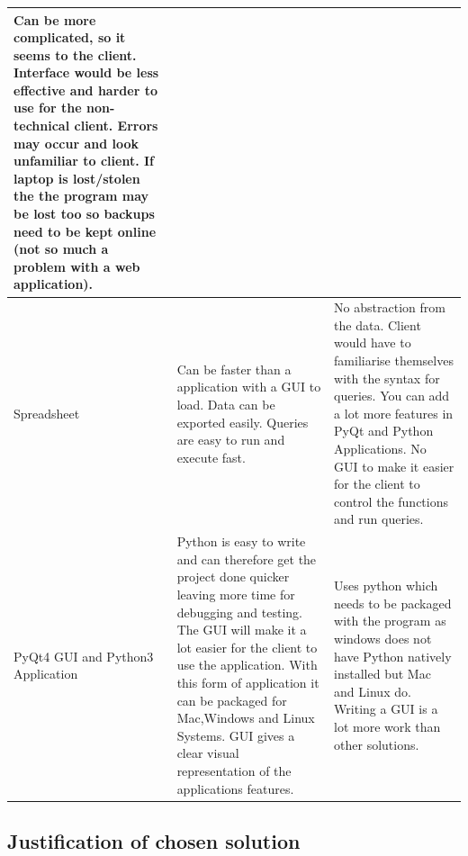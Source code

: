 \begin{flushleft}
\begin{longtable}{|p{3cm}|p{4cm}|p{4cm}|}
Can be more complicated, so it seems to the client.
Interface would be less effective and harder to use for the non-technical client.
Errors may occur and look unfamiliar to client.
If laptop is lost/stolen the the program may be lost too so backups need to be kept online (not so much a problem with a web application).

\\ \hline

Spreadsheet &

Can be faster than a application with a GUI to load.
Data can be exported easily.
Queries are easy to run and execute fast. &

No abstraction from the data.
Client would have to familiarise themselves with the syntax for queries.
You can add a lot more features in PyQt and Python Applications.
No GUI to make it easier for the client to control the functions and run queries. 

\\ \hline

PyQt4 GUI and Python3 Application &

Python is easy to write and can therefore get the project done quicker leaving more time for debugging and testing.
The GUI will make it a lot easier for the client to use the application.
With this form of application it can be packaged for Mac,Windows and Linux Systems.
GUI gives a clear visual representation of the applications features. &

Uses python which needs to be packaged with the program as windows does not have Python natively installed but Mac and Linux do.
Writing a GUI is a lot more work than other solutions. 

\\ \hline

\end{longtable}
\label{tab:Alternative Solutions to the problem}
\end{flushleft}



\subsection{Justification of chosen solution}

